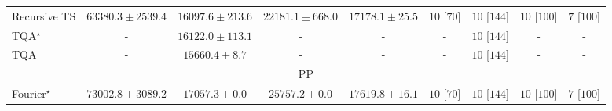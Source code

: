 \begin{tabular}{l|cccc|cccc|}
Recursive TS & {\cellcolor[HTML]{A93C03}} \color[HTML]{F1F1F1} $63380.3\pm 2539.4$ & {\cellcolor[HTML]{FFFDDC}} \color[HTML]{000000} $16097.6\pm 213.6$ & {\cellcolor[HTML]{FFF6BA}} \color[HTML]{000000} $22181.1\pm 668.0$ & {\cellcolor[HTML]{FFFCD6}} \color[HTML]{000000} $17178.1\pm 25.5$ & {\cellcolor[HTML]{49006A}} \color[HTML]{F1F1F1} $10$ [$70$] & {\cellcolor[HTML]{49006A}} \color[HTML]{F1F1F1} $10$ [$144$] & {\cellcolor[HTML]{49006A}} \color[HTML]{F1F1F1} $10$ [$100$] & {\cellcolor[HTML]{CD238F}} \color[HTML]{F1F1F1} $7$ [$100$] \\
TQA$^\star$ & {\cellcolor[HTML]{000000}} \color[HTML]{F1F1F1} {\cellcolor{white}} \color{black} - & {\cellcolor[HTML]{FFFDDC}} \color[HTML]{000000} $16122.0\pm 113.1$ & {\cellcolor[HTML]{000000}} \color[HTML]{F1F1F1} {\cellcolor{white}} \color{black} - & {\cellcolor[HTML]{000000}} \color[HTML]{F1F1F1} {\cellcolor{white}} \color{black} - & {\cellcolor[HTML]{000000}} \color[HTML]{F1F1F1} {\cellcolor{white}} \color{black} - & {\cellcolor[HTML]{49006A}} \color[HTML]{F1F1F1} $10$ [$144$] & {\cellcolor[HTML]{000000}} \color[HTML]{F1F1F1} {\cellcolor{white}} \color{black} - & {\cellcolor[HTML]{000000}} \color[HTML]{F1F1F1} {\cellcolor{white}} \color{black} - \\
TQA & {\cellcolor[HTML]{000000}} \color[HTML]{F1F1F1} {\cellcolor{white}} \color{black} - & {\cellcolor[HTML]{FFFEDF}} \color[HTML]{000000} $15660.4\pm 8.7$ & {\cellcolor[HTML]{000000}} \color[HTML]{F1F1F1} {\cellcolor{white}} \color{black} - & {\cellcolor[HTML]{000000}} \color[HTML]{F1F1F1} {\cellcolor{white}} \color{black} - & {\cellcolor[HTML]{000000}} \color[HTML]{F1F1F1} {\cellcolor{white}} \color{black} - & {\cellcolor[HTML]{49006A}} \color[HTML]{F1F1F1} $10$ [$144$] & {\cellcolor[HTML]{000000}} \color[HTML]{F1F1F1} {\cellcolor{white}} \color{black} - & {\cellcolor[HTML]{000000}} \color[HTML]{F1F1F1} {\cellcolor{white}} \color{black} - \\
\cline{1-9}
\multicolumn{9}{c}{\rule{0pt}{8pt}PP} \\
\midrule
Fourier$^\star$ & {\cellcolor[HTML]{004529}} \color[HTML]{F1F1F1} $73002.8\pm 3089.2$ & {\cellcolor[HTML]{FCFED6}} \color[HTML]{000000} $17057.3\pm 0.0$ & {\cellcolor[HTML]{E7F6AD}} \color[HTML]{000000} $25757.2\pm 0.0$ & {\cellcolor[HTML]{FBFED2}} \color[HTML]{000000} $17619.8\pm 16.1$ & {\cellcolor[HTML]{49006A}} \color[HTML]{F1F1F1} $10$ [$70$] & {\cellcolor[HTML]{49006A}} \color[HTML]{F1F1F1} $10$ [$144$] & {\cellcolor[HTML]{49006A}} \color[HTML]{F1F1F1} $10$ [$100$] & {\cellcolor[HTML]{CD238F}} \color[HTML]{F1F1F1} $7$ [$100$] \\

\end{tabular}
